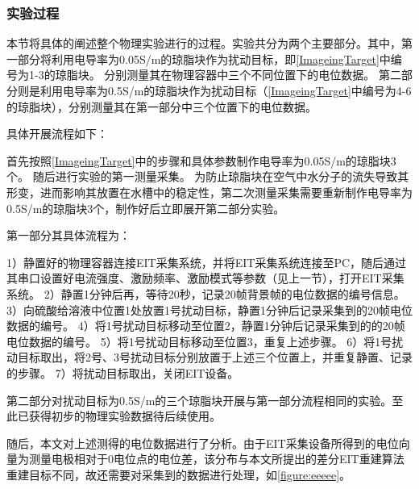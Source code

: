\subsubsection{实验过程}

本节将具体的阐述整个物理实验进行的过程。实验共分为两个主要部分。其中，第一部分将利用电导率为0.05S/m的琼脂块作为扰动目标，即\cref{ImageingTarget}中编号为1-3的琼脂块。
分别测量其在物理容器中三个不同位置下的电位数据。
第二部分则是利用电导率为0.5S/m的琼脂块作为扰动目标（\cref{ImageingTarget}中编号为4-6的琼脂块），分别测量其在第一部分中三个位置下的电位数据。

具体开展流程如下：

首先按照\cref{ImageingTarget}中的步骤和具体参数制作电导率为0.05S/m的琼脂块3个。
随后进行实验的第一测量采集。
为防止琼脂块在空气中水分子的流失导致其形变，进而影响其放置在水槽中的稳定性，第二次测量采集需要重新制作电导率为0.5S/m的琼脂块3个，制作好后立即展开第二部分实验。

第一部分其具体流程为：

     1）静置好的物理容器连接EIT采集系统，并将EIT采集系统连接至PC，随后通过其串口设置好电流强度、激励频率、激励模式等参数（见上一节），打开EIT采集系统。
     2）静置1分钟后再，等待20秒，记录20帧背景帧的电位数据的编号信息。
     3）向硫酸给溶液中位置1处放置1号扰动目标，静置1分钟后记录采集到的20帧电位数据的编号。
     4）将1号扰动目标移动至位置2，静置1分钟后记录采集到的的20帧电位数据的编号。
     5）将1号扰动目标移动至位置3，重复上述步骤。
     6）将1号扰动目标取出，将2号、3号扰动目标分别放置于上述三个位置上，并重复静置、记录的步骤。
     7）将扰动目标取出，关闭EIT设备。


第二部分对扰动目标为0.5S/m的三个琼脂块开展与第一部分流程相同的实验。至此已获得初步的物理实验数据待后续使用。

随后，本文对上述测得的电位数据进行了分析。由于EIT采集设备所得到的电位向量为测量电极相对于0电位点的电位差，该分布与本文所提出的差分EIT重建算法重建目标不同，故还需要对采集到的数据进行处理，如\cref{figure:eeeee}。

